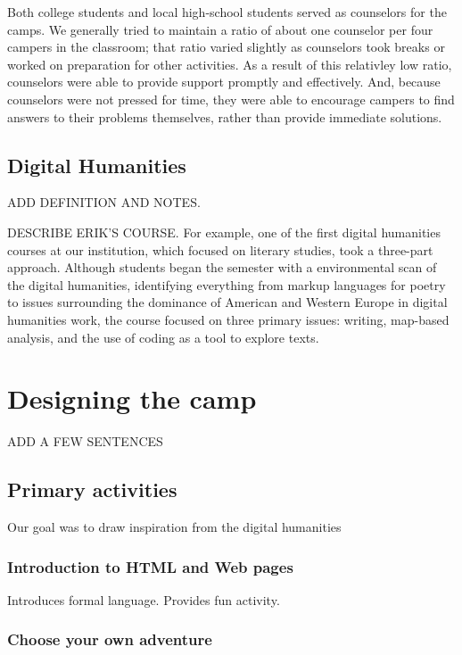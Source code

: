 Both college students and local high-school students served as
counselors for the camps.  We generally tried to maintain a ratio
of about one counselor per four campers in the classroom; that ratio
varied slightly as counselors took breaks or worked on preparation
for other activities.  As a result of this relativley low ratio,
counselors were able to provide support promptly and effectively.
And, because counselors were not pressed for time, they were able
to encourage campers to find answers to their problems themselves,
rather than provide immediate solutions.

\subsection{Digital Humanities}

ADD DEFINITION AND NOTES.

DESCRIBE ERIK'S COURSE.  For example, one of the first digital humanities
courses at our institution, which focused on literary studies, took a
three-part approach.  Although students began the semester with a 
environmental scan of the digital humanities, identifying everything
from markup languages for poetry to issues surrounding the dominance
of American and Western Europe in digital humanities work, the course
focused on three primary issues: writing, map-based analysis, and the
use of coding as a tool to explore texts.

\section{Designing the camp}

ADD A FEW SENTENCES

\subsection{Primary activities}

Our goal was to draw inspiration from the digital humanities

\subsubsection{Introduction to HTML and Web pages}

Introduces formal language.  Provides fun activity.

\subsubsection{Choose your own adventure}

